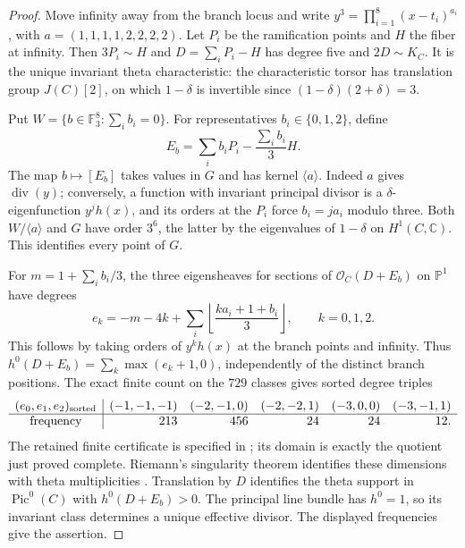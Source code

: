 \begin{proof}
Move infinity away from the branch locus and write
$y^3=\prod_{i=1}^8(x-t_i)^{a_i}$, with
$a=(1,1,1,1,2,2,2,2)$. Let $P_i$ be the ramification points and
$H$ the fiber at infinity. Then $3P_i\sim H$ and
$D=\sum_iP_i-H$ has degree five and $2D\sim K_C$.
It is the unique invariant theta characteristic: the characteristic
torsor has translation group $J(C)[2]$, on which $1-\delta$ is
invertible since $(1-\delta)(2+\delta)=3$.

Put $W=\{b\in\mathbb F_3^8:\sum_i b_i=0\}$.
For representatives $b_i\in\{0,1,2\}$, define
\[
 E_b=\sum_i b_iP_i-\frac{\sum_i b_i}{3}H.
\]
The map $b\mapsto[E_b]$ takes values in $G$ and has kernel
$\langle a\rangle$. Indeed $a$ gives $\operatorname{div}(y)$;
conversely, a function with invariant principal divisor is a
$\delta$-eigenfunction $y^j h(x)$, and its orders at the $P_i$
force $b_i=ja_i$ modulo three. Both $W/\langle a\rangle$ and
$G$ have order $3^6$, the latter by the eigenvalues of $1-\delta$
on $H^1(C,\mathbb C)$. This identifies every point of $G$.

For $m=1+\sum_i b_i/3$, the three eigensheaves for sections of
$\mathcal O_C(D+E_b)$ on $\mathbb P^1$ have degrees
\[
 e_k=-m-4k+\sum_i\left\lfloor\frac{ka_i+1+b_i}{3}\right\rfloor,
 \qquad k=0,1,2.
\]
This follows by taking orders of $y^k h(x)$ at the branch points
and infinity. Thus $h^0(D+E_b)=\sum_k\max(e_k+1,0)$, independently
of the distinct branch positions. The exact finite count on the
$729$ classes gives sorted degree triples
\[
\begin{array}{c|rrrrr}
(e_0,e_1,e_2)_{\rm sorted}&(-1,-1,-1)&(-2,-1,0)&(-2,-2,1)&(-3,0,0)&(-3,-1,1)\\
\hline
\text{frequency}&213&456&24&24&12.
\end{array}
\]
The retained finite certificate is specified in
; its domain is
exactly the quotient just proved complete. Riemann's singularity
theorem identifies these dimensions with theta multiplicities
\cite[Introduction, smooth-curve statement]{CasalainaMartinKass2012}.
Translation by $D$ identifies the theta support in $\operatorname{Pic}^0(C)$
with $h^0(D+E_b)>0$. The principal line bundle has $h^0=1$,
so its invariant class determines a unique effective divisor.
The displayed frequencies give the assertion.
\end{proof}

